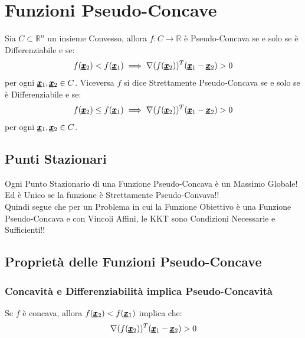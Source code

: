 \section{Funzioni Pseudo-Concave}
Sia $C \subset \mathbb{R}^n$ un insieme Convesso, allora $f: C \longrightarrow \mathbb{R}$ è Pseudo-Concava se e solo se è Differenziabile e se:
\begin{equation*}
    f(\pmb{\underline{x}}_2) < f(\pmb{\underline{x}}_1) \implies \nabla(f(\pmb{\underline{x}}_2))^T (\pmb{\underline{x}}_1 - \pmb{\underline{x}}_2) > 0
\end{equation*}
per ogni $\pmb{\underline{x}}_1, \pmb{\underline{x}}_2 \in C$.
Viceversa $f$ si dice Strettamente Pseudo-Concava se e solo se è Differenziabile e se:
\begin{equation*}
    f(\pmb{\underline{x}}_2) \leq f(\pmb{\underline{x}}_1) \implies \nabla(f(\pmb{\underline{x}}_2))^T (\pmb{\underline{x}}_1 - \pmb{\underline{x}}_2) > 0
\end{equation*}
per ogni $\pmb{\underline{x}}_1, \pmb{\underline{x}}_2 \in C$.

\subsection{Punti Stazionari}
Ogni Punto Stazionario di una Funzione Pseudo-Concava è un Massimo Globale! Ed è Unico se la funzione è Strettamente Pseudo-Convava!!\\
Quindi segue che per un Problema in cui la Funzione Obiettivo è una Funzione Pseudo-Concava e con Vincoli Affini, le KKT sono Condizioni Necessarie e Sufficienti!!

\subsection{Proprietà delle Funzioni Pseudo-Concave}
\subsubsection{Concavità e Differenziabilità implica Pseudo-Concavità}
Se $f$ è concava, allora $f(\pmb{\underline{x}}_2) < f(\pmb{\underline{x}}_1)$ implica che:
\begin{equation*}
    \nabla(f(\pmb{\underline{x}}_2))^T (\pmb{\underline{x}}_1 - \pmb{\underline{x}}_2) > 0
\end{equation*}
